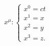 \documentclass[preview]{standalone}
\begin{document}
\begin{align*}
x^\mu : \begin{cases}  x^0  = ct \\  x^1  = x \\  x^2  = y \\  x^3  =z. \end{cases}
\end{align*}
\end{document}
